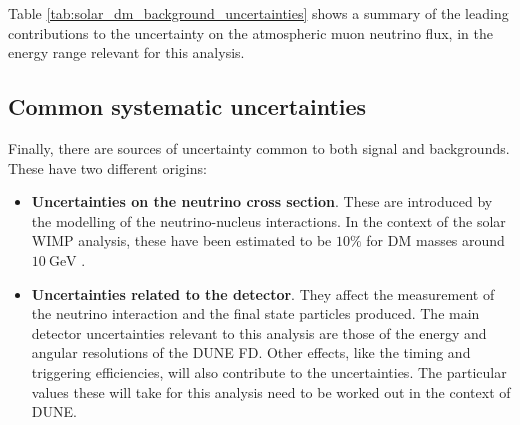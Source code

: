 Table \ref{tab:solar_dm_background_uncertainties} shows a summary of the leading contributions to the uncertainty on the atmospheric muon neutrino flux, in the energy range relevant for this analysis.

\subsection{Common systematic uncertainties}

Finally, there are sources of uncertainty common to both signal and backgrounds. These have two different origins:

\begin{itemize}
	\item \textbf{Uncertainties on the neutrino cross section}. These are introduced by the modelling of the neutrino-nucleus interactions. In the context of the solar WIMP analysis, these have been estimated to be $10\%$ for DM masses around $10~\mathrm{GeV}$ \cite{Boliev2013}.
	\item \textbf{Uncertainties related to the detector}. They affect the measurement of the neutrino interaction and the final state particles produced. The main detector uncertainties relevant to this analysis are those of the energy and angular resolutions of the DUNE FD. Other effects, like the timing and triggering efficiencies, will also contribute to the uncertainties. The particular values these will take for this analysis need to be worked out in the context of DUNE.
\end{itemize}